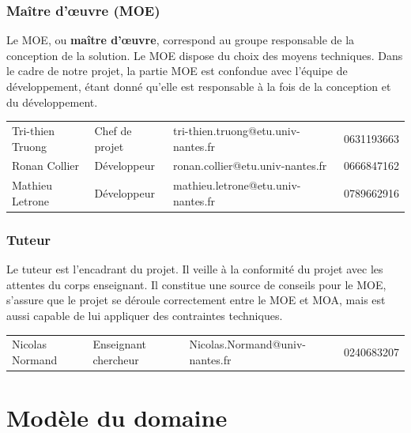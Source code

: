 \documentclass[12pt,titlepage,french]{article}
\begin{document}
\subsubsection*{Maître d'œuvre (MOE)}

Le MOE, ou \textbf{maître d'œuvre}, correspond au groupe responsable de la conception de la solution.
Le MOE dispose du choix des moyens techniques.
Dans le cadre de notre projet, la partie MOE est confondue avec l'équipe de développement, étant donné qu'elle est responsable à la fois de la conception et du développement.\\

\noindent\begin{tabu} to \textwidth {X[c2]X[c]X[c3]X[c]}\toprule
     &&                       &\\\toprule
Tri-thien Truong& Chef de projet&tri-thien.truong@etu.univ-nantes.fr&    0631193663\\\midrule
   Ronan Collier& Développeur&   ronan.collier@etu.univ-nantes.fr&    0666847162\\\midrule
 Mathieu Letrone& Développeur& mathieu.letrone@etu.univ-nantes.fr&    0789662916\\\bottomrule
\end{tabu}


\subsubsection*{Tuteur}

Le tuteur est l'encadrant du projet. Il veille à la conformité du projet avec les attentes du corps enseignant.
Il constitue une source de conseils pour le MOE, s'assure que le projet se déroule correctement entre le MOE et MOA, mais est aussi capable de lui appliquer des contraintes techniques.\\ 

\noindent\begin{tabu} to \textwidth {X[c2]X[c2]X[c3]X[c]}\toprule
     &&                       &\\\toprule
Nicolas Normand& Enseignant chercheur&Nicolas.Normand@univ-nantes.fr&    0240683207\\\bottomrule
\end{tabu}


\section{Modèle du domaine}
\end{document}
